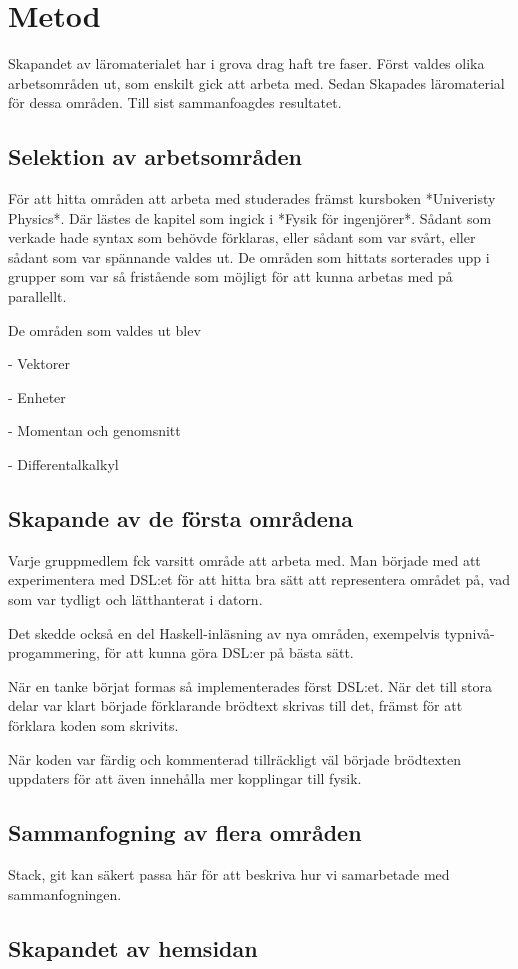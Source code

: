 
\chapter{Metod}

\begin{binge}
Skapandet av läromaterialet har i grova drag haft tre faser. Först valdes olika arbetsområden ut, som enskilt gick att arbeta med. Sedan Skapades läromaterial för dessa områden. Till sist sammanfoagdes resultatet.

\section{Selektion av arbetsområden}

För att hitta områden att arbeta med studerades främst kursboken *Univeristy Physics*. Där lästes de kapitel som ingick i *Fysik för ingenjörer*. Sådant som verkade hade syntax som behövde förklaras, eller sådant som var svårt, eller sådant som var spännande valdes ut. De områden som hittats sorterades upp i grupper som var så fristående som möjligt för att kunna arbetas med på parallellt.

De områden som valdes ut blev

- Vektorer

- Enheter

- Momentan och genomsnitt

- Differentalkalkyl

\section{Skapande av de första områdena}

Varje gruppmedlem fck varsitt område att arbeta med. Man började med att experimentera med DSL:et för att hitta bra sätt att representera området på, vad som var tydligt och lätthanterat i datorn.

Det skedde också en del Haskell-inläsning av nya områden, exempelvis typnivå-progammering, för att kunna göra DSL:er på bästa sätt.

När en tanke börjat formas så implementerades först DSL:et. När det till stora delar var klart började förklarande brödtext skrivas till det, främst för att förklara koden som skrivits.

När koden var färdig och kommenterad tillräckligt väl började brödtexten uppdaters för att även innehålla mer kopplingar till fysik.

\section{Sammanfogning av flera områden}

Stack, git kan säkert passa här för att beskriva hur vi samarbetade med sammanfogningen.

\section{Skapandet av hemsidan}

\end{binge}